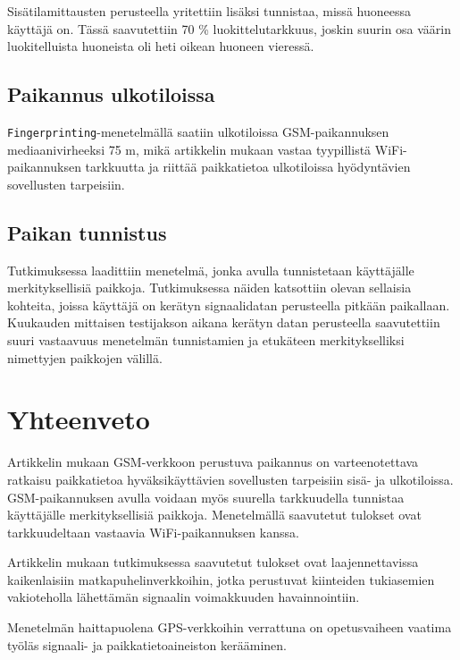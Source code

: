 \documentclass[a4paper]{scrartcl}
\begin{document}
Sisätilamittausten perusteella yritettiin lisäksi tunnistaa,
missä huoneessa käyttäjä on. Tässä saavutettiin 70 \%
luokittelutarkkuus, joskin suurin osa väärin luokitelluista
huoneista oli heti oikean huoneen vieressä.

\subsection{Paikannus ulkotiloissa}

\texttt{Fingerprinting}-menetelmällä saatiin ulkotiloissa
GSM-paikannuksen mediaanivirheeksi 75 m, mikä artikkelin
mukaan vastaa tyypillistä WiFi-paikannuksen tarkkuutta ja
riittää paikkatietoa ulkotiloissa hyödyntävien sovellusten
tarpeisiin.

\subsection{Paikan tunnistus}

Tutkimuksessa laadittiin menetelmä, jonka avulla
tunnistetaan käyttäjälle merkityksellisiä paikkoja.
Tutkimuksessa näiden katsottiin olevan sellaisia kohteita,
joissa käyttäjä on kerätyn signaalidatan perusteella pitkään
paikallaan.  Kuukauden mittaisen testijakson aikana kerätyn
datan perusteella saavutettiin suuri vastaavuus menetelmän
tunnistamien ja etukäteen merkitykselliksi nimettyjen
paikkojen välillä.

\section{Yhteenveto}

Artikkelin mukaan GSM-verkkoon perustuva paikannus on
varteenotettava ratkaisu paikkatietoa hyväksikäyttävien
sovellusten tarpeisiin sisä- ja ulkotiloissa.
GSM-paikannuksen avulla voidaan myös suurella tarkkuudella
tunnistaa käyttäjälle merkityksellisiä paikkoja.
Menetelmällä saavutetut tulokset ovat tarkkuudeltaan
vastaavia WiFi-paikannuksen kanssa.

Artikkelin mukaan tutkimuksessa saavutetut tulokset ovat
laajennettavissa kaikenlaisiin matkapuhelinverkkoihin, jotka
perustuvat kiinteiden tukiasemien vakioteholla lähet\-tämän
signaalin voimakkuuden havainnointiin.

Menetelmän haittapuolena GPS-verkkoihin verrattuna on
opetusvaiheen vaatima työläs signaali- ja
paikkatietoaineiston kerääminen.



\end{document}
